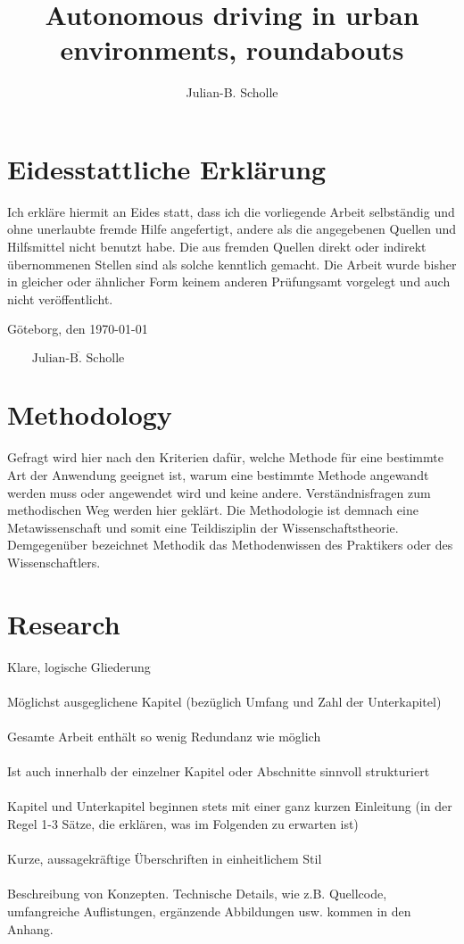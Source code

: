 \documentclass[11pt,oneside,openright]{mpreport}
\title{Autonomous driving in urban environments, roundabouts}
\author{Julian-B. Scholle}
\begin{document}
\maketitle

\tableofcontents

\chapter*{Eidesstattliche Erklärung}
Ich erkläre hiermit an Eides statt, dass ich die vorliegende Arbeit selbständig und
ohne unerlaubte fremde Hilfe angefertigt, andere als die angegebenen Quellen und
Hilfsmittel nicht benutzt habe. Die aus fremden Quellen direkt oder indirekt
übernommenen Stellen sind als solche kenntlich gemacht.
Die Arbeit wurde bisher in gleicher oder ähnlicher Form keinem anderen
Prüfungsamt vorgelegt und auch nicht veröffentlicht.

\noindent Göteborg, den \today
\begin{flushright}
$\overline{~~~~~~~~~\mbox{Julian-B. Scholle}~~~~~~~~~}$
\end{flushright}




\chapter{Methodology}
Gefragt wird hier nach den Kriterien dafür, welche Methode für eine bestimmte Art der Anwendung geeignet ist, warum eine bestimmte Methode angewandt werden muss oder angewendet wird und keine andere. Verständnisfragen zum methodischen Weg werden hier geklärt. Die Methodologie ist demnach eine Metawissenschaft und somit eine Teildisziplin der Wissenschaftstheorie. Demgegenüber bezeichnet Methodik das Methodenwissen des Praktikers oder des Wissenschaftlers.




\chapter{Research}
Klare, logische Gliederung\\\\
Möglichst ausgeglichene Kapitel (bezüglich Umfang und Zahl der Unterkapitel)\\\\
Gesamte Arbeit enthält so wenig Redundanz wie möglich\\\\
Ist auch innerhalb der einzelner Kapitel oder Abschnitte sinnvoll strukturiert\\\\
Kapitel und Unterkapitel beginnen stets mit einer ganz kurzen Einleitung (in der Regel 1-3 Sätze, die erklären, was im Folgenden zu erwarten ist)\\\\
Kurze, aussagekräftige Überschriften in einheitlichem Stil\\\\
Beschreibung von Konzepten. Technische Details, wie z.B. Quellcode, umfangreiche Auflistungen, ergänzende Abbildungen usw. kommen in den Anhang.\\\\
\end{document}
